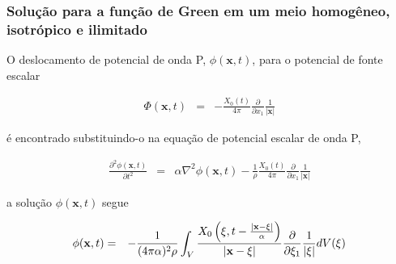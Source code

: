 \documentclass[xcolor=table]{beamer}
\newcommand{\xvec}{\mathbf{x}}
\newcommand{\xivec}{\boldmath \xi}
\begin{document}
\begin{frame}
\frametitle{\textbf{Solu\c{c}\~ao para a fun\c{c}\~ao de Green em um meio homog\^eneo, isotr\'opico e ilimitado}}

\begin{flushleft}
O deslocamento de potencial de onda P, $\phi(\xvec,t)$, para o potencial de fonte escalar 
\end{flushleft}
\begin{eqnarray}
  \label{ten1}
      \Phi(\xvec,t) &=& - \frac{X_{0}(t)}{4\pi} \frac{\partial }{\partial x_1} \frac{1}{\left| \xvec \right|} \, 
\end{eqnarray}

\begin{flushleft} 
\'e encontrado substituindo-o na equa\c{c}\~ao de potencial escalar de onda P,
\end{flushleft}
\begin{eqnarray}
  \label{ten1}
       \frac{\partial^2 \phi(\xvec,t)}{\partial t^2} &=& \alpha \nabla^2 \phi(\xvec,t) - \frac{1}{\rho}\frac{X_{0}(t)}{4\pi} \frac{\partial }{\partial x_1} \frac{1}{\left| \xvec \right|} \,       
\end{eqnarray}
\begin{flushleft}
a solu\c{c}\~ao $\phi(\xvec,t)$ segue
\end{flushleft}
\begin{eqnarray}
  \label{ten1}
       \phi(\xvec,t) &=& - \frac{1}{(4\pi\alpha)^{2} \rho} \int_{V} \frac{ X_{0} \left( \xivec,t - \frac{\left|\xvec - \xivec \right|}{\alpha}  \right) }{\left|\xvec - \xivec \right|} \frac{\partial }{\partial \xi_1} \frac{1}{\left| \xivec \right|} dV(\xivec)\,       
\end{eqnarray}


\end{frame}%
\end{document}
